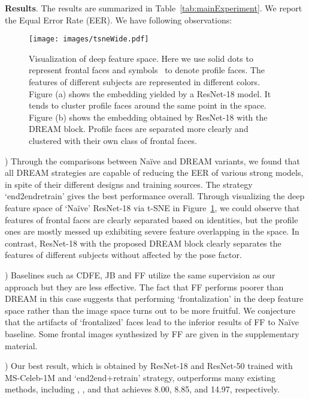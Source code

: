 \documentclass[10pt,twocolumn,letterpaper]{article}
\begin{document}
\vspace{0.1cm}
\noindent
\textbf{Results}.
The results are summarized in Table~\ref{tab:mainExperiment}. We report the Equal Error Rate (EER). We have following observations:

\begin{figure}[t]
\begin{center}
   \texttt{[image: images/tsneWide.pdf]}
\end{center}
\vskip -0.4cm
   \caption{Visualization of deep feature space. Here we use solid dots  to represent frontal faces and symbols \RIGHTcircle~to denote profile faces. The features of different subjects are represented in different colors. Figure (a) shows the embedding yielded by a ResNet-18 model. It tends to cluster profile faces around the same point in the space. Figure (b) shows the embedding obtained by ResNet-18 with the DREAM block. Profile faces are separated more clearly and clustered with their own class of frontal faces.}
\label{fig:tSNE}
\vskip -0.25cm
\end{figure} 

) Through the comparisons between Na\"{i}ve and DREAM variants, we found that all DREAM strategies are capable of reducing the EER of various strong models, in spite of their different designs and training sources. The strategy `end2endretrain' gives the best performance overall. Through visualizing the deep feature space of `Na\"{i}ve' ResNet-18 via t-SNE in Figure~\ref{fig:tSNE}, we could observe that features of frontal faces are clearly separated based on identities, but the profile ones are mostly messed up exhibiting severe feature overlapping in the space. In contrast, ResNet-18 with the proposed DREAM block clearly separates the features of different subjects without affected by the pose factor.


) Baselines such as CDFE, JB and FF utilize the same supervision as our approach but they are less effective. The fact that FF performs poorer than DREAM in this case suggests that performing `frontalization' in the deep feature space rather than the image space turns out to be more fruitful. We conjecture that the artifacts of `frontalized' faces lead to the inferior results of FF to Na\"{i}ve baseline. Some frontal images synthesized by FF are given in the supplementary material.

) Our best result, which is obtained by ResNet-18 and ResNet-50 trained with MS-Celeb-1M and `end2end+retrain' strategy, outperforms many existing methods, including \cite{chen2016fisher}, \cite{sankaranarayanan2016triplet}, and \cite{sengupta2016frontal} that achieves 8.00, 8.85, and 14.97, respectively.
\end{document}
